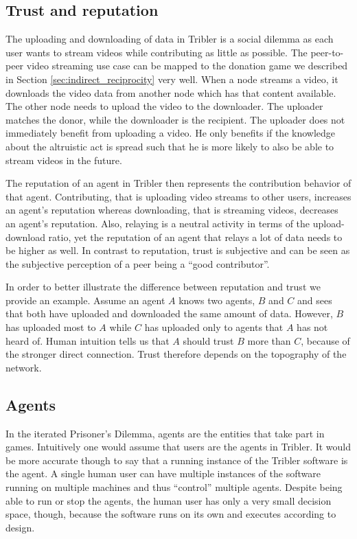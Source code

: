\subsection{Trust and reputation}
The uploading and downloading of data in Tribler is a social dilemma as each user wants to 
stream videos while contributing as little as possible.
The peer-to-peer video streaming use case can be mapped to the donation game we described in 
Section \ref{sec:indirect_reciprocity} very well. When a node streams a video, it downloads the video
data from another node which has that content available. The other node needs to upload the video to
the downloader. The uploader matches the donor, while the downloader is the recipient. The uploader
does not immediately benefit from uploading a video. He only benefits if the knowledge about the 
altruistic act is spread such that he is more likely to also be able to stream videos in the future.

The reputation of an agent in Tribler then represents the 
contribution behavior of that agent. Contributing, that is uploading video streams to other users,
increases an agent's reputation whereas downloading, that is streaming videos, decreases an agent's 
reputation. Also, relaying is a neutral activity in terms of the upload-download ratio, yet the 
reputation of an agent that relays a lot of data needs to be higher as well. In contrast to 
reputation, trust is subjective and can be seen as the subjective perception of a peer being a 
``good contributor''. 

In order to better illustrate the difference between reputation and trust we provide an example.
Assume an agent $A$ knows two agents, $B$ and $C$ and sees that both have uploaded and downloaded 
the same amount of data. However, $B$ has uploaded most to $A$ while $C$ has uploaded only to 
agents that $A$ has not heard of. Human intuition tells us that $A$ should trust $B$ more than $C$, 
because of the stronger direct connection. Trust therefore depends on the topography of the network.

\subsection{Agents}
In the iterated Prisoner's Dilemma, agents are the entities that take part in games. Intuitively one
would assume that users are the agents in Tribler. It would be more accurate though to say that a 
running instance of the Tribler software is the agent. A single human user can have multiple 
instances of the software running on multiple machines and thus ``control'' multiple agents. Despite
being able to run or stop the agents, the human user has only a very small decision space, though, 
because the software runs on its own and executes according to design. 

